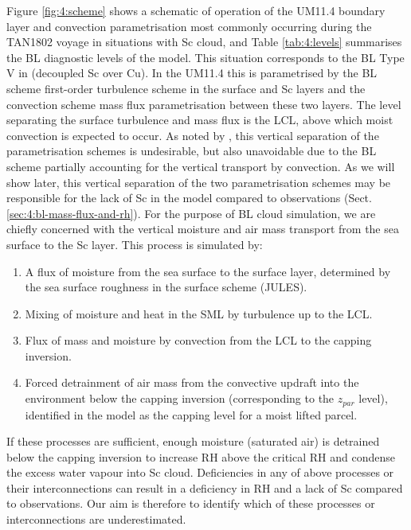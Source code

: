 Figure \ref{fig:4:scheme} shows a schematic of operation of the UM11.4 boundary layer and convection
parametrisation most
commonly occurring during the TAN1802 voyage in situations with Sc cloud,
and Table \ref{tab:4:levels} summarises the BL diagnostic levels of the model.
This situation corresponds to the BL Type V in \cite{lock2000} (decoupled Sc over Cu).
In the UM11.4 this is parametrised by the BL scheme first-order turbulence scheme
in the surface and Sc layers and the convection scheme mass flux parametrisation
between these two layers. The level separating the surface turbulence and
mass flux is the LCL, above which moist convection is expected to occur.
As noted by \cite{lock2000}, this vertical separation of the parametrisation
schemes is undesirable, but also unavoidable due to the BL scheme partially
accounting for the vertical transport by convection. As we will show later,
this vertical separation of the two parametrisation schemes may be responsible for the
lack of Sc in the model compared to observations (Sect. \ref{sec:4:bl-mass-flux-and-rh}). For the purpose of BL
cloud simulation, we are chiefly concerned with the vertical moisture and air
mass transport from the sea surface to the Sc layer. This process is simulated
by:

\begin{enumerate}
\item A flux of moisture from the sea surface to the surface layer, determined
by the sea surface roughness in the surface scheme (JULES).
\item Mixing of moisture and heat in the SML by turbulence up to the LCL.
\item Flux of mass and moisture by convection from the LCL to the capping inversion.
\item Forced detrainment of air mass from the convective updraft into the environment
below the capping inversion (corresponding to the $z_{par}$ level),
identified in the model as the capping level for a moist lifted parcel.
\end{enumerate}

If these processes are sufficient, enough moisture (saturated air) is detrained
below the capping inversion to increase RH above the critical RH and condense the
excess water vapour into Sc cloud. Deficiencies in any of above processes or their interconnections can result in a deficiency in RH and a lack of Sc compared to observations. Our aim is therefore to identify which of these processes or interconnections are underestimated.

